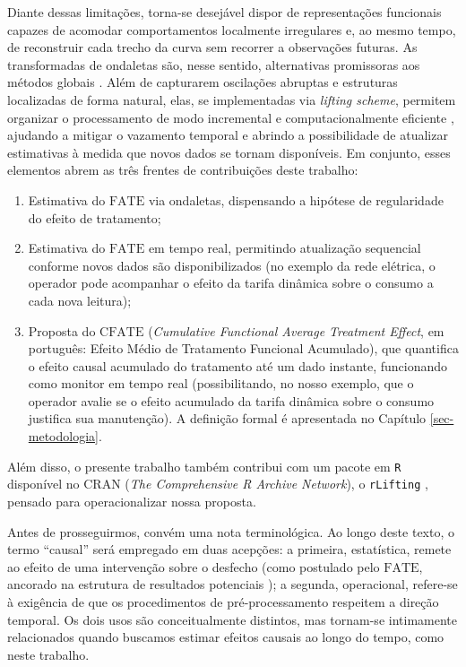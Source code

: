 Diante dessas limitações, torna-se desejável dispor de representações funcionais capazes de acomodar comportamentos localmente irregulares e, ao mesmo tempo, de reconstruir cada trecho da curva sem recorrer a observações futuras. 
As transformadas de ondaletas são, nesse sentido, alternativas promissoras aos métodos globais \cite{vidakovic_statistical_1999, donoho_ideal_1994}. 
Além de capturarem oscilações abruptas e estruturas localizadas de forma natural, elas, se implementadas via \emph{lifting scheme}, permitem organizar o processamento de modo incremental e computacionalmente eficiente \cite{liu_improved_2014}, ajudando a mitigar o vazamento temporal e abrindo a possibilidade de atualizar estimativas à medida que novos dados se tornam disponíveis. 
Em conjunto, esses elementos abrem as três frentes de contribuições deste trabalho:
\begin{enumerate}
    \item Estimativa do \(\mathrm{FATE}\) via ondaletas, dispensando a hipótese de regularidade do efeito de tratamento;
    \item Estimativa do \(\mathrm{FATE}\) em tempo real, permitindo atualização sequencial conforme novos dados são disponibilizados (no exemplo da rede elétrica, o operador pode acompanhar o efeito da tarifa dinâmica sobre o consumo a cada nova leitura);
    \item Proposta do \(\mathrm{CFATE}\) (\emph{Cumulative Functional Average Treatment Effect}, em português: Efeito Médio de Tratamento Funcional Acumulado), que quantifica o efeito causal acumulado do tratamento até um dado instante, funcionando como monitor em tempo real (possibilitando, no nosso exemplo, que o operador avalie se o efeito acumulado da tarifa dinâmica sobre o consumo justifica sua manutenção). 
    A definição formal é apresentada no Capítulo \ref{sec-metodologia}.
\end{enumerate}
Além disso, o presente trabalho também contribui com um pacote em \texttt{R} \cite{r_core_team_2024} disponível no CRAN (\emph{The Comprehensive R Archive Network}), o \texttt{rLifting} \cite{dasilvaRLiftingHighPerformanceWavelet2026}, pensado para operacionalizar nossa proposta.

Antes de prosseguirmos, convém uma nota terminológica. 
Ao longo deste texto, o termo ``causal'' será empregado em duas acepções: a primeira, estatística, remete ao efeito de uma intervenção sobre o desfecho (como postulado pelo \(\mathrm{FATE}\), ancorado na estrutura de resultados potenciais \cite{holland_statistics_1986, rubin_estimating_1974}); a segunda, operacional, refere-se à exigência de que os procedimentos de pré-processamento respeitem a direção temporal.  
Os dois usos são conceitualmente distintos, mas tornam-se intimamente relacionados quando buscamos estimar efeitos causais ao longo do tempo, como neste trabalho.

